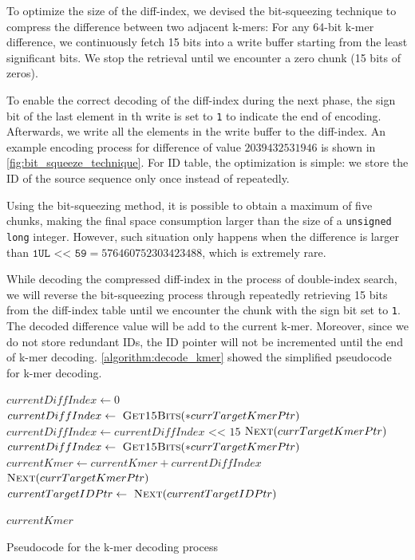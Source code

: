 To optimize the size of the diff-index, we devised the bit-squeezing technique to compress the difference between two adjacent k-mers:
For any 64-bit k-mer difference, we continuously fetch 15 bits into a write buffer starting from the least significant bits. We stop the retrieval until we encounter a zero chunk (15 bits of zeros).

To enable the correct decoding of the diff-index during the next phase, the sign bit of the last element in th write is set to \texttt{1} to indicate the end of encoding. Afterwards, we write all the elements in the write buffer to the diff-index. An example encoding process for difference of value $2039432531946$ is shown in \autoref{fig:bit_squeeze_technique}. For ID table, the optimization is simple: we store the ID of the source sequence only once instead of repeatedly.

Using the bit-squeezing method, it is possible to obtain a maximum of five chunks, making the final space consumption larger than the size of a \texttt{unsigned long} integer. However, such situation only happens when the difference is larger than $\texttt{1UL << 59} = 576460752303423488$, which is extremely rare.

While decoding the compressed diff-index in the process of double-index search, we will reverse the bit-squeezing process through repeatedly retrieving 15 bits from the diff-index table until we encounter the chunk with the sign bit set to \texttt{1}. The decoded difference value will be add to the current k-mer. Moreover, since we do not store redundant IDs, the ID pointer will not be incremented until the end of k-mer decoding. \cref{algorithm:decode_kmer} showed the simplified pseudocode for k-mer decoding.

\begin{algorithm}[htbp]
  \begin{algorithmic}
    \State $currentDiffIndex \gets 0$
     
    \State $currentDiffIndex \gets\ \textsc{Get15Bits}(*currTargetKmerPtr)$
    \State $currentDiffIndex \gets currentDiffIndex \texttt{ << } 15$
    \State $\textsc{Next}(currTargetKmerPtr)$
    \EndWhile
    \State $currentDiffIndex \gets\ \textsc{Get15Bits}(*currTargetKmerPtr)$
    \State $currentKmer \gets currentKmer + currentDiffIndex$
    \State $\textsc{Next}(currTargetKmerPtr)$
    \State $currentTargetIDPtr \gets\ \textsc{Next}(currentTargetIDPtr)$
    \par
    \Return $currentKmer$
    \EndProcedure
    \caption{ Pseudocode for the k-mer decoding process} \label{algorithm:decode_kmer}
  \end{algorithmic}
\end{algorithm}

